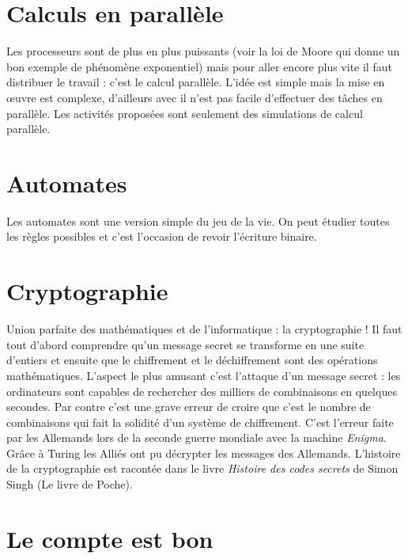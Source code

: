 \documentclass[11pt,class=report,crop=false]{standalone}
\begin{document}
\section{Calculs en parallèle}

Les processeurs sont de plus en plus puissants (voir la loi de Moore qui donne un bon exemple de phénomène exponentiel) mais pour aller encore plus vite il faut distribuer le travail : c'est le calcul parallèle. L'idée est simple mais la mise en \oe uvre est complexe, d'ailleurs avec \Python{} il n'est pas facile d'effectuer des tâches en parallèle. Les activités proposées sont seulement des simulations de calcul parallèle.


\section{Automates}

Les automates sont une version simple du \og{}jeu de la vie\fg{}. On peut étudier toutes les règles possibles et c'est l'occasion de revoir l'écriture binaire. 


\section{Cryptographie}

Union parfaite des mathématiques et de l'informatique : la cryptographie !
Il faut tout d'abord comprendre qu'un message secret se transforme en une suite d'entiers et ensuite que le chiffrement et le déchiffrement sont des opérations mathématiques. 
L'aspect le plus amusant c'est l'attaque d'un message secret : les ordinateurs sont capables de rechercher des milliers de combinaisons en quelques secondes. Par contre c'est une grave erreur de croire que c'est le nombre de combinaisons qui fait la solidité d'un système de chiffrement. C'est l'erreur faite par les Allemands lors de la seconde guerre mondiale avec la machine \emph{Enigma}. Grâce à Turing les Alliés ont pu décrypter les messages des Allemands.
L'histoire de la cryptographie est racontée dans le livre \emph{Histoire des codes secrets} de Simon Singh (Le livre de Poche).


\section{Le compte est bon}
\end{document}
